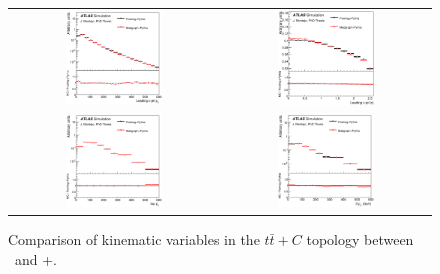 \begin{figure}[p]
\begin{center}
\begin{tabular}{cc}
\includegraphics[width=0.48\textwidth]{Modeling/Figures/defaultcc_tt1gccq_q1_pt_norm.eps} &
\includegraphics[width=0.48\textwidth]{Modeling/Figures/defaultcc_tt1gccq_q1_eta_norm.eps} \\
\includegraphics[width=0.48\textwidth]{Modeling/Figures/defaultcc_tt1gccq_top_pt_norm.eps} &
\includegraphics[width=0.48\textwidth]{Modeling/Figures/defaultcc_tt1gccq_ttbar_pt_norm.eps} \\
\end{tabular}
\caption{Comparison of kinematic variables in the $t\bar{t}+C$ topology between \PP\ and \madgraph+\pythia.}
\label{fig:defaultcc_tt1gcc}
\end{center}
\end{figure}
